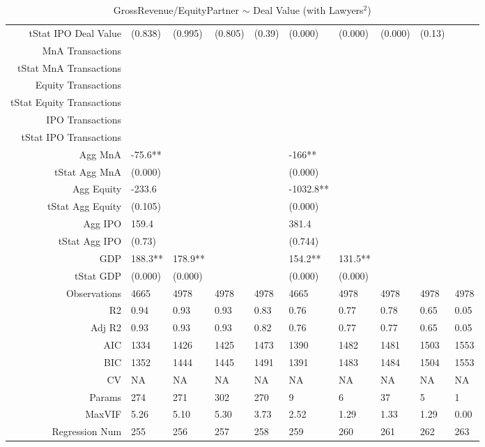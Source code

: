 \begin{table}[ht]
\begin{tabular}{rlllllllll}
  tStat IPO Deal Value & (0.838) & (0.995) & (0.805) & (0.39) & (0.000) & (0.000) & (0.000) & (0.13) &  \\ 
  MnA Transactions &  &  &  &  &  &  &  &  &  \\ 
  tStat MnA Transactions &  &  &  &  &  &  &  &  &  \\ 
  Equity Transactions &  &  &  &  &  &  &  &  &  \\ 
  tStat Equity Transactions &  &  &  &  &  &  &  &  &  \\ 
  IPO Transactions &  &  &  &  &  &  &  &  &  \\ 
  tStat IPO Transactions &  &  &  &  &  &  &  &  &  \\ 
  Agg MnA & -75.6** &  &  &  & -166** &  &  &  &  \\ 
  tStat Agg MnA & (0.000) &  &  &  & (0.000) &  &  &  &  \\ 
  Agg Equity & -233.6 &  &  &  & -1032.8** &  &  &  &  \\ 
  tStat Agg Equity & (0.105) &  &  &  & (0.000) &  &  &  &  \\ 
  Agg IPO & 159.4 &  &  &  & 381.4 &  &  &  &  \\ 
  tStat Agg IPO & (0.73) &  &  &  & (0.744) &  &  &  &  \\ 
  GDP & 188.3** & 178.9** &  &  & 154.2** & 131.5** &  &  &  \\ 
  tStat GDP & (0.000) & (0.000) &  &  & (0.000) & (0.000) &  &  &  \\ 
  Observations & 4665 & 4978 & 4978 & 4978 & 4665 & 4978 & 4978 & 4978 & 4978 \\ 
  R2 & 0.94 & 0.93 & 0.93 & 0.83 & 0.76 & 0.77 & 0.78 & 0.65 & 0.05 \\ 
  Adj R2 & 0.93 & 0.93 & 0.93 & 0.82 & 0.76 & 0.77 & 0.77 & 0.65 & 0.05 \\ 
  AIC & 1334 & 1426 & 1425 & 1473 & 1390 & 1482 & 1481 & 1503 & 1553 \\ 
  BIC & 1352 & 1444 & 1445 & 1491 & 1391 & 1483 & 1484 & 1504 & 1553 \\ 
  CV & NA & NA & NA & NA & NA & NA & NA & NA & NA \\ 
  Params & 274 & 271 & 302 & 270 & 9 & 6 & 37 & 5 & 1 \\ 
  MaxVIF & 5.26 & 5.10 & 5.30 & 3.73 & 2.52 & 1.29 & 1.33 & 1.29 & 0.00 \\ 
  Regression Num & 255 & 256 & 257 & 258 & 259 & 260 & 261 & 262 & 263 \\ 
   \hline
\end{tabular}
\caption{GrossRevenue/EquityPartner $\sim$ Deal Value (with Lawyers$^2$)} 
\end{table}
